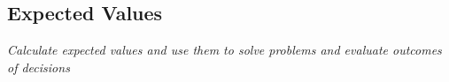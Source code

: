 \subsection[expected values]{Expected Values}

\textit{Calculate expected values and use them to solve problems and evaluate outcomes of decisions}